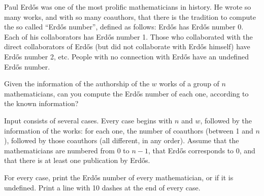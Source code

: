 

\Statement

Paul Erdős was one of the most prolific mathematicians in history.
He wrote so many works, and with so many coauthors,
that there is the tradition to compute the so called ``Erdős number'',
defined as follows:
Erdős has Erdős number 0.
Each of his collaborators has Erdős number 1.
Those who collaborated with the direct collaborators of Erdős
(but did not collaborate with Erdős himself) have Erdős number 2, etc.
People with no connection with Erdős have an undefined Erdős number.

\medskip

Given the information  of the authorship of the $w$ works
of a group of $n$ mathematicians,
can you compute the Erdős number of each one,
according to the known information?


\Input

Input consists of several cases.
Every case begins with $n$ and $w$,
followed by the information of the works:
for each one, the number of coauthors (between 1 and $n$),
followed by those coauthors (all different, in any order).
Assume that the mathematicians are numbered from 0 to $n - 1$,
that Erdős corresponds to 0,
and that there is at least one publication by Erdős.


\Output

For every case, print the Erdős number of every mathematician,
or  if it is undefined.
Print a line with 10 dashes at the end of every case.


\Sample

